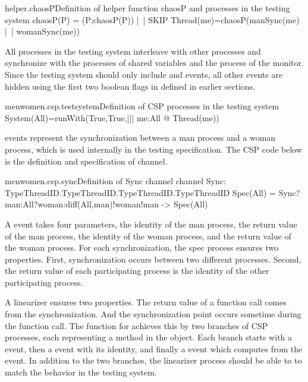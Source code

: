 \documentclass[a4paper, 12pt]{article}
\begin{document}
\begin{cspinline}{helper.chaosP}{Definition of helper function chaosP and processes in the testing system}
chaosP(P) = (P;chaosP(P)) |~| SKIP
Thread(me)=chaosP(manSync(me) |~| womanSync(me))
\end{cspinline}
  
All processes in the testing system interleave with other processes and synchronize with the processes of shared variables and the process of the monitor. Since the testing system should only include  and  events, all other events are hidden using the first two boolean flags in  defined in earlier sections. 

\begin{cspinline}{menwomen.csp.testsystem}{Definition of CSP processes in the testing system}
System(All)=runWith(True,True,||| me:All @ Thread(me))
\end{cspinline}

 events represent the synchronization between a man process and a woman process, which is used internally in the testing specification. The CSP code below is the definition and specification of  channel. 

\begin{cspinline}{menwomen.csp.sync}{Definition of Sync channel}
  channel Sync: TypeThreadID.TypeThreadID.TypeThreadID.TypeThreadID
  Spec(All) = Sync?man:All?woman:diff(All,{man})!woman!man -> Spec(All)
\end{cspinline}
  
A  event takes four parameters, the identity of the man process, the return value of the man process, the identity of the woman process, and the return value of the woman process. For each synchronization, the spec process ensures two properties. First, synchronization occurs between two different processes. Second, the return value of each participating process is the identity of the other participating process. 


A linearizer ensures two properties. The return value of a function call comes from the synchronization. And the synchronization point occurs sometime during the function call. The  function for  achieves this by two branches of CSP processes, each representing a method in the object. Each branch starts with a  event, then a  event with its identity, and finally a  event which computes from the  event. In addition to the two branches, the linearizer process should be able to  to match the behavior in the testing system.
\end{document}
